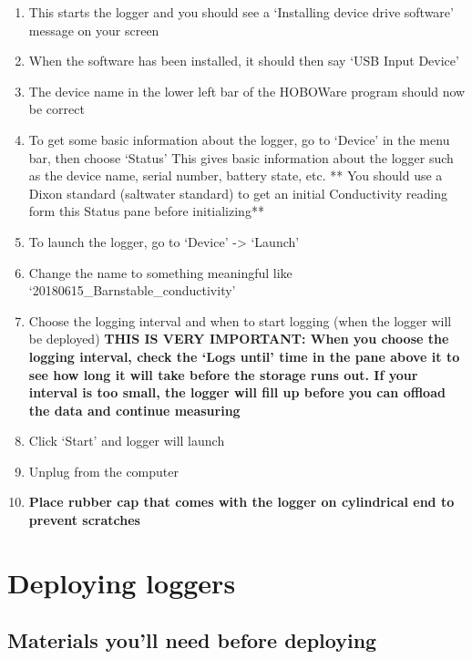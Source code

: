 \documentclass[
  letterpaper,
  DIV=11,
  numbers=noendperiod]{scrreprt}
\begin{document}
\begin{enumerate}
\def\labelenumi{\arabic{enumi}.}
\item
  This starts the logger and you should see a `Installing device drive
  software' message on your screen
\item
  When the software has been installed, it should then say `USB Input
  Device'
\item
  The device name in the lower left bar of the HOBOWare program should
  now be correct
\item
  To get some basic information about the logger, go to `Device' in the
  menu bar, then choose `Status' This gives basic information about the
  logger such as the device name, serial number, battery state, etc. **
  You should use a Dixon standard (saltwater standard) to get an initial
  Conductivity reading form this Status pane before initializing**
\item
  To launch the logger, go to `Device' -\textgreater{} `Launch'
\item
  Change the name to something meaningful like
  `20180615\_Barnstable\_conductivity'
\item
  Choose the logging interval and when to start logging (when the logger
  will be deployed) \textbf{THIS IS VERY IMPORTANT: When you choose the
  logging interval, check the `Logs until' time in the pane above it to
  see how long it will take before the storage runs out. If your
  interval is too small, the logger will fill up before you can offload
  the data and continue measuring}
\item
  Click `Start' and logger will launch
\item
  Unplug from the computer
\item
  \textbf{Place rubber cap that comes with the logger on cylindrical end
  to prevent scratches}
\end{enumerate}

\hypertarget{deploying-loggers}{%
\section*{\texorpdfstring{\textbf{Deploying
loggers}}{Deploying loggers}}\label{deploying-loggers}}

\hypertarget{materials-youll-need-before-deploying}{%
\subsection*{\texorpdfstring{\textbf{Materials you'll need before
deploying}}{Materials you'll need before deploying}}\label{materials-youll-need-before-deploying}}
\end{document}
